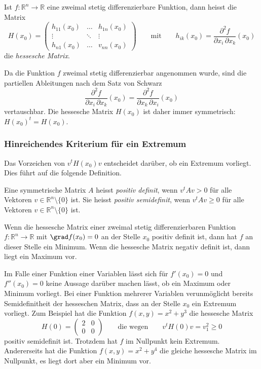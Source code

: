 \begin{definition}
Ist $f\colon\mathbb{R}^n\to\mathbb{R}$ eine zweimal stetig differenzierbare
Funktion, dann heisst die Matrix
\[
H(x_0)
=
\begin{pmatrix}
h_{11}(x_0)&\dots &h_{1n}(x_0)\\
\vdots&\ddots&\vdots\\
h_{n1}(x_0)&\dots &v_{nn}(x_0)
\end{pmatrix}
\qquad\text{mit}\qquad
h_{ik}(x_0)
=
\frac{\partial^2 f}{\partial x_i\,\partial x_k}(x_0)
\]
die {\em hessesche Matrix}.
%
\end{definition}

Da die Funktion $f$ zweimal stetig differenzierbar angenommen wurde,
sind die partiellen Ableitungen nach dem Satz von Schwarz
\[
\frac{\partial^2 f}{\partial x_i\,\partial x_k}(x_0)
=
\frac{\partial^2 f}{\partial x_k\,\partial x_i}(x_0)
\]
vertauschbar.
Die hessesche Matrix $H(x_0)$ ist daher immer symmetrisch: $H(x_0)^t=H(x_0)$.

%
%
\subsubsection{Hinreichendes Kriterium für ein Extremum}
Das Vorzeichen von $v^tH(x_0)v$ entscheidet darüber, ob ein Extremum
vorliegt.
Dies führt auf die folgende Definition.

\begin{definition}
Eine symmetrische Matrix $A$ heisst {\em positiv definit}, wenn 
%
%
$v^tAv>0$ für alle Vektoren $v\in\mathbb{R}^n\setminus\{0\}$ ist.
Sie heisst {\em positiv semidefinit}, wenn $v^tAv\ge 0$ für alle
Vektoren
%
%
$v\in\mathbb{R}^n\setminus\{0\}$ ist.
\end{definition}

\begin{satz}
\label{buch:fuvar:hessesche:satz:kriterium}
Wenn die hessesche Matrix einer zweimal stetig differenzierbaren
Funktion $f\colon\mathbb{R}^n\to\mathbb{R}$ mit $\grad f(x_0)=0$ 
an der Stelle $x_0$ positiv definit ist, dann hat $f$ an dieser
Stelle ein Minimum.
Wenn die hessesche Matrix negativ definit ist, dann liegt ein Maximum
vor.
\end{satz}

Im Falle einer Funktion einer Variablen lässt sich für $f'(x_0)=0$
und $f''(x_0)=0$ keine Aussage darüber machen lässt, ob ein Maximum 
oder Minimum vorliegt.
Bei einer Funktion mehrerer Variablen verunmöglicht bereits Semidefinitheit
der hesseschen Matrix, dass an der Stelle $x_0$ ein Extremum vorliegt.
Zum Beispiel hat die Funktion $f(x,y)=x^2+y^3$ die hessesche Matrix
\[
H(0)
=
\begin{pmatrix}
2&0\\
0&0
\end{pmatrix}
\qquad\text{die wegen}\qquad
v^tH(0)v = v_1^2 \ge 0
\]
positiv semidefinit ist.
Trotzdem hat $f$ im Nullpunkt kein Extremum.
Andererseits hat die Funktion $f(x,y)=x^2+y^4$ die gleiche hessesche
Matrix im Nullpunkt, es liegt dort aber ein Minimum vor.

